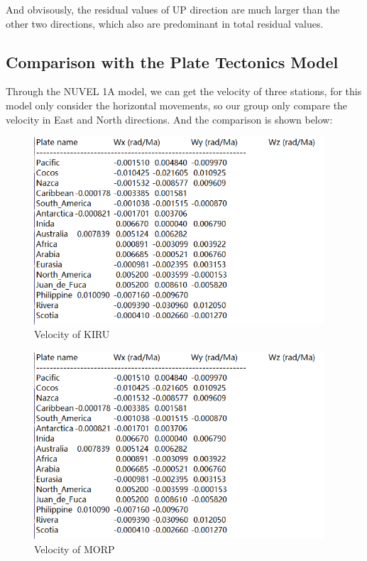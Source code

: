\documentclass{article}
\begin{document}
And obvisously, the residual values of UP direction are much larger than the other two directions, which also are predominant in total residual values.


\subsection{Comparison with the Plate Tectonics Model}
Through the NUVEL 1A model, we can get the velocity of three stations, for this model only consider the horizontal movements,
so our group only compare the velocity in East and North directions. And the comparison is shown below:
\begin{figure}[htbp]
  \centering
  \includegraphics[height=7cm]{../source/nuvel.png}
  \captionsetup{skip=0.2cm}
  \caption{Velocity of KIRU}
  \label{fig:Vel_KIRU}
\end{figure}
\begin{figure}[htbp]
  \centering
  \includegraphics[height=7cm]{../source/nuvel.png}
  \caption{Velocity of MORP}
  \label{fig:Vel_MORP}
\end{figure}
\end{document}
